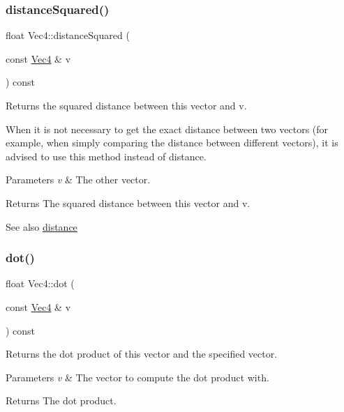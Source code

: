 \subsubsection{\texorpdfstring{distance\+Squared()}{distanceSquared()}\hspace{0.1cm}{\footnotesize\ttfamily [2/2]}}
{\footnotesize\ttfamily float Vec4\+::distance\+Squared (\begin{DoxyParamCaption}\item[{const \hyperlink{classVec4}{Vec4} \&}]{v }\end{DoxyParamCaption}) const}

Returns the squared distance between this vector and v.

When it is not necessary to get the exact distance between two vectors (for example, when simply comparing the distance between different vectors), it is advised to use this method instead of distance.


\begin{DoxyParams}{Parameters}
{\em v} & The other vector.\\
\hline
\end{DoxyParams}
\begin{DoxyReturn}{Returns}
The squared distance between this vector and v.
\end{DoxyReturn}
\begin{DoxySeeAlso}{See also}
\hyperlink{classVec4_a067897a2fd0c8b42e73a07e461d83099}{distance} 
\end{DoxySeeAlso}
\mbox{\label{classVec4_ab23760fc52f652e9382d98f1e50e8a1b}} 
\subsubsection{\texorpdfstring{dot()}{dot()}\hspace{0.1cm}{\footnotesize\ttfamily [1/4]}}
{\footnotesize\ttfamily float Vec4\+::dot (\begin{DoxyParamCaption}\item[{const \hyperlink{classVec4}{Vec4} \&}]{v }\end{DoxyParamCaption}) const}

Returns the dot product of this vector and the specified vector.


\begin{DoxyParams}{Parameters}
{\em v} & The vector to compute the dot product with.\\
\hline
\end{DoxyParams}
\begin{DoxyReturn}{Returns}
The dot product. 
\end{DoxyReturn}
\mbox{\label{classVec4_ab23760fc52f652e9382d98f1e50e8a1b}} 
